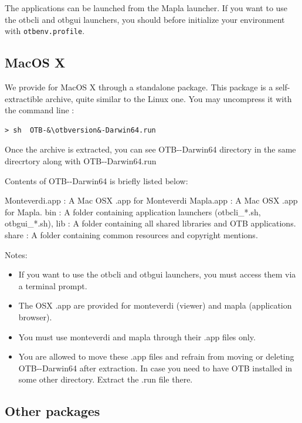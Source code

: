 The applications can be launched from the Mapla launcher. If you want to use
the otbcli and otbgui launchers, you should before initialize your environment
with \verb?otbenv.profile?.

\subsection{MacOS X}

We provide \app for MacOS X through a standalone package. This package is a
self-extractible archive, quite similar to the Linux one. You may uncompress
it with the command line :


\begin{lstlisting}[frame=none,numbers=none]
> sh  OTB-&\otbversion&-Darwin64.run
\end{lstlisting}

Once the archive is extracted,  you can see OTB-\otbversion-Darwin64 directory in the same direcrtory along with OTB-\otbversion-Darwin64.run

Contents of OTB-\otbversion-Darwin64 is briefly listed below:

    Monteverdi.app : A Mac OSX .app for Monteverdi
    Mapla.app : A Mac OSX .app for Mapla.
    bin : A folder containing application launchers (otbcli_*.sh, otbgui_*.sh),
    lib : A folder containing all shared libraries and OTB applications.
    share : A folder containing common resources and copyright mentions.

Notes:
\begin{itemize}
\item If you want to use the otbcli and otbgui launchers, you must access them via a terminal prompt.
\item The OSX .app are provided for monteverdi (viewer) and mapla (application browser).
\item You must use monteverdi and mapla through their .app files only.
\item You are allowed to move these .app files and refrain from moving or deleting OTB-\otbversion-Darwin64 after extraction.
In case you need to have OTB installed in some other directory. Extract the .run file there.
\end{itemize}

\subsection{Other packages}

